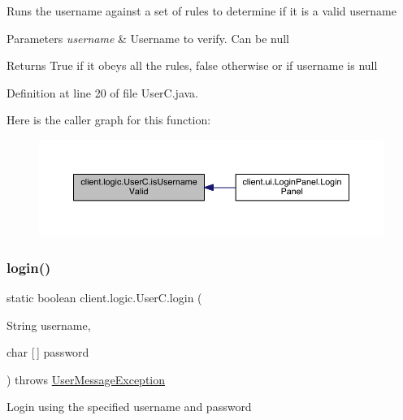 Runs the username against a set of rules to determine if it is a valid username


\begin{DoxyParams}{Parameters}
{\em username} & Username to verify. Can be null \\
\hline
\end{DoxyParams}
\begin{DoxyReturn}{Returns}
True if it obeys all the rules, false otherwise or if username is null 
\end{DoxyReturn}


Definition at line 20 of file User\+C.\+java.

Here is the caller graph for this function\+:
\nopagebreak
\begin{figure}[H]
\begin{center}
\leavevmode
\includegraphics[width=350pt]{classclient_1_1logic_1_1_user_c_a62765c4c4912ee02b3ef70f1b9c0fb4e_icgraph}
\end{center}
\end{figure}
\hypertarget{classclient_1_1logic_1_1_user_c_aa3736b2a54be77a2b631ca49b9980a8c}{}\label{classclient_1_1logic_1_1_user_c_aa3736b2a54be77a2b631ca49b9980a8c} 
\subsubsection{\texorpdfstring{login()}{login()}}
{\footnotesize\ttfamily static boolean client.\+logic.\+User\+C.\+login (\begin{DoxyParamCaption}\item[{String}]{username,  }\item[{char \mbox{[}$\,$\mbox{]}}]{password }\end{DoxyParamCaption}) throws \hyperlink{classpt_1_1up_1_1fe_1_1lpro1613_1_1sharedlib_1_1exceptions_1_1_user_message_exception}{User\+Message\+Exception}\hspace{0.3cm}{\ttfamily [static]}}

Login using the specified username and password



